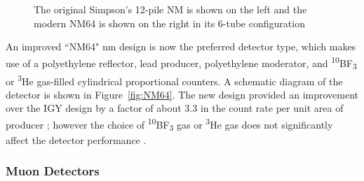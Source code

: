 \begin{figure}[ht!]
	\centering
	\qquad
	\caption{The original Simpson's 12-pile NM is shown on the left and the modern NM64 is shown on the right in its 6-tube configuration \citep{kang_characteristics_2012}}
	\label{fig:NM}
\end{figure}

An improved ``NM64" \gls{nm} design is now the preferred detector type, which makes use of a polyethylene reflector, lead producer, polyethylene moderator, and \textsuperscript{10}BF\textsubscript{3} or \textsuperscript{3}He gas-filled cylindrical proportional counters. A schematic diagram of the detector is shown in Figure~\ref{fig:NM64}. The new design provided an improvement over the IGY design by a factor of about 3.3 in the count rate per unit area of producer \citep{stoker_neutron_2000}; however the choice of \textsuperscript{10}BF\textsubscript{3} gas or \textsuperscript{3}He gas does not significantly affect the detector performance \citep{kang_characteristics_2012}.



\subsubsection*{Muon Detectors}

